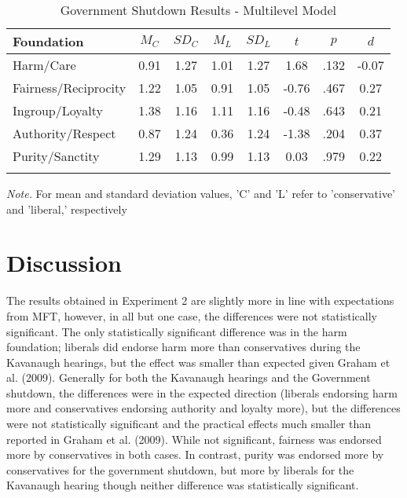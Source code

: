 \documentclass[
  english,
  man]{apa6}
\begin{document}
\begin{table}[pt]

\begin{center}
\begin{threeparttable}

\caption{\label{tab:exp2-tablegs}Government Shutdown Results - Multilevel Model}

\footnotesize{

\begin{tabular}{lccccccc}
\toprule
Foundation & $M_C$ & $SD_C$ & $M_L$ & $SD_L$ & $t$ & $p$ & $d$\\
\midrule
Harm/Care & 0.91 & 1.27 & 1.01 & 1.27 & 1.68 & .132 & -0.07\\
Fairness/Reciprocity & 1.22 & 1.05 & 0.91 & 1.05 & -0.76 & .467 & 0.27\\
Ingroup/Loyalty & 1.38 & 1.16 & 1.11 & 1.16 & -0.48 & .643 & 0.21\\
Authority/Respect & 0.87 & 1.24 & 0.36 & 1.24 & -1.38 & .204 & 0.37\\
Purity/Sanctity & 1.29 & 1.13 & 0.99 & 1.13 & 0.03 & .979 & 0.22\\
\bottomrule
\addlinespace
\end{tabular}

}

\begin{tablenotes}[para]
\normalsize{\textit{Note.} For mean and standard deviation values, 'C' and 'L' refer to 'conservative' and 'liberal,' respectively}
\end{tablenotes}

\end{threeparttable}
\end{center}

\end{table}

\hypertarget{discussion-1}{%
\section{Discussion}\label{discussion-1}}

The results obtained in Experiment 2 are slightly more in line with expectations from MFT, however, in all but one case, the differences were not statistically significant. The only statistically significant difference was in the harm foundation; liberals did endorse harm more than conservatives during the Kavanaugh hearings, but the effect was smaller than expected given Graham et al. (2009). Generally for both the Kavanaugh hearings and the Government shutdown, the differences were in the expected direction (liberals endorsing harm more and conservatives endorsing authority and loyalty more), but the differences were not statistically significant and the practical effects much smaller than reported in Graham et al. (2009). While not significant, fairness was endorsed more by conservatives in both cases. In contrast, purity was endorsed more by conservatives for the government shutdown, but more by liberals for the Kavanaugh hearing though neither difference was statistically significant.
\end{document}
